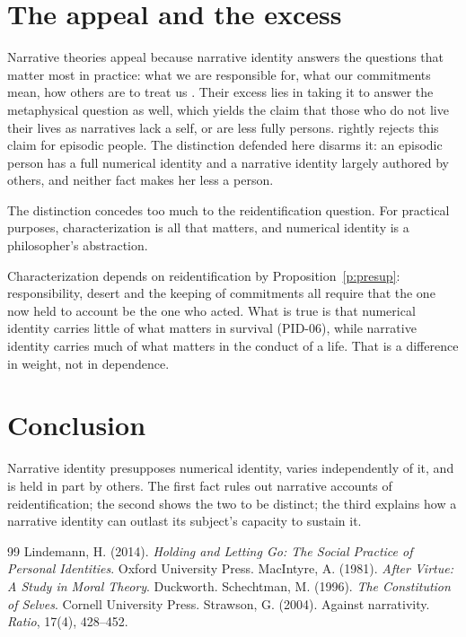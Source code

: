 \documentclass{situationist-preprint}
\begin{document}
\section{The appeal and the excess}

Narrative theories appeal because narrative identity answers the questions that matter most in practice: what we are responsible for, what our commitments mean, how others are to treat us \citep{MacIntyre1981}. Their excess lies in taking it to answer the metaphysical question as well, which yields the claim that those who do not live their lives as narratives lack a self, or are less fully persons. \citet{GStrawson2004} rightly rejects this claim for episodic people. The distinction defended here disarms it: an episodic person has a full numerical identity and a narrative identity largely authored by others, and neither fact makes her less a person.

\begin{objection}
The distinction concedes too much to the reidentification question. For practical purposes, characterization is all that matters, and numerical identity is a philosopher's abstraction.
\end{objection}

\begin{reply}
Characterization depends on reidentification by Proposition~\ref{p:presup}: responsibility, desert and the keeping of commitments all require that the one now held to account be the one who acted. What is true is that numerical identity carries little of what matters in survival (PID-06), while narrative identity carries much of what matters in the conduct of a life. That is a difference in weight, not in dependence.
\end{reply}

\section{Conclusion}

Narrative identity presupposes numerical identity, varies independently of it, and is held in part by others. The first fact rules out narrative accounts of reidentification; the second shows the two to be distinct; the third explains how a narrative identity can outlast its subject's capacity to sustain it.

\begin{thebibliography}{99}\small
{} Lindemann, H. (2014). \emph{Holding and Letting Go: The Social Practice of Personal Identities}. Oxford University Press.
 MacIntyre, A. (1981). \emph{After Virtue: A Study in Moral Theory}. Duckworth.
 Schechtman, M. (1996). \emph{The Constitution of Selves}. Cornell University Press.
 Strawson, G. (2004). Against narrativity. \emph{Ratio}, 17(4), 428--452.
\end{thebibliography}
\end{document}
